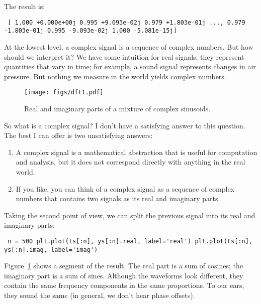 \documentclass[12pt]{book} \usepackage[width=5.5in,height=8.5in, hmarginratio=3:2,vmarginratio=1:1]{geometry}
\begin{document}
The result is: 

\begin{verbatim} [ 1.000 +0.000e+00j 0.995 +9.093e-02j 0.979 +1.803e-01j ..., 0.979 -1.803e-01j 0.995 -9.093e-02j 1.000 -5.081e-15j] \end{verbatim} 

At the lowest level, a complex signal is a sequence of complex numbers. But how should we interpret it? We have some intuition for real signals: they represent quantities that vary in time; for example, a sound signal represents changes in air pressure. But nothing we measure in the world yields complex numbers. 

\begin{figure} 

\centerline{\texttt{[image: figs/dft1.pdf]}} \caption{Real and imaginary parts of a mixture of complex sinusoids.} \label{fig.dft1} \end{figure} 

So what is a complex signal? I don't have a satisfying answer to this question. The best I can offer is two unsatisfying answers: 

\begin{enumerate} 

\item A complex signal is a mathematical abstraction that is useful for computation and analysis, but it does not correspond directly with anything in the real world. 

\item If you like, you can think of a complex signal as a sequence of complex numbers that contains two signals as its real and imaginary parts. 

\end{enumerate} 

Taking the second point of view, we can split the previous signal into its real and imaginary parts: 

\begin{verbatim} n = 500 plt.plot(ts[:n], ys[:n].real, label='real') plt.plot(ts[:n], ys[:n].imag, label='imag') \end{verbatim} 

Figure~\ref{fig.dft1} shows a segment of the result. The real part is a sum of cosines; the imaginary part is a sum of sines. Although the waveforms look different, they contain the same frequency components in the same proportions. To our ears, they sound the same (in general, we don't hear phase offsets). 
\end{document}
